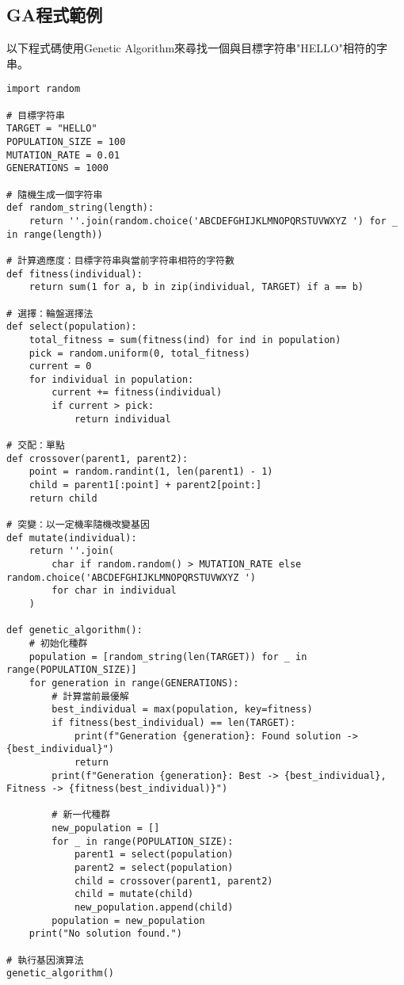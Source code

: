\subsection{GA程式範例}
以下程式碼使用Genetic Algorithm來尋找一個與目標字符串"HELLO"相符的字串。
\begin{verbatim}
import random

# 目標字符串
TARGET = "HELLO"
POPULATION_SIZE = 100
MUTATION_RATE = 0.01
GENERATIONS = 1000

# 隨機生成一個字符串
def random_string(length):
    return ''.join(random.choice('ABCDEFGHIJKLMNOPQRSTUVWXYZ ') for _ in range(length))

# 計算適應度：目標字符串與當前字符串相符的字符數
def fitness(individual):
    return sum(1 for a, b in zip(individual, TARGET) if a == b)

# 選擇：輪盤選擇法
def select(population):
    total_fitness = sum(fitness(ind) for ind in population)
    pick = random.uniform(0, total_fitness)
    current = 0
    for individual in population:
        current += fitness(individual)
        if current > pick:
            return individual

# 交配：單點
def crossover(parent1, parent2):
    point = random.randint(1, len(parent1) - 1)
    child = parent1[:point] + parent2[point:]
    return child

# 突變：以一定機率隨機改變基因
def mutate(individual):
    return ''.join(
        char if random.random() > MUTATION_RATE else random.choice('ABCDEFGHIJKLMNOPQRSTUVWXYZ ')
        for char in individual
    )

def genetic_algorithm():
    # 初始化種群
    population = [random_string(len(TARGET)) for _ in range(POPULATION_SIZE)]
    for generation in range(GENERATIONS):
        # 計算當前最優解
        best_individual = max(population, key=fitness)
        if fitness(best_individual) == len(TARGET):
            print(f"Generation {generation}: Found solution -> {best_individual}")
            return
        print(f"Generation {generation}: Best -> {best_individual}, Fitness -> {fitness(best_individual)}")
        
        # 新一代種群
        new_population = []
        for _ in range(POPULATION_SIZE):
            parent1 = select(population)
            parent2 = select(population)
            child = crossover(parent1, parent2)
            child = mutate(child)
            new_population.append(child)
        population = new_population
    print("No solution found.")

# 執行基因演算法
genetic_algorithm()
\end{verbatim}

